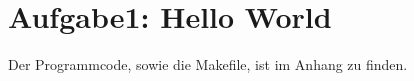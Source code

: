 \newpage
\section{Aufgabe1: Hello World}
\label{sec:auf1}

Der Programmcode, sowie die Makefile, ist im Anhang zu finden.